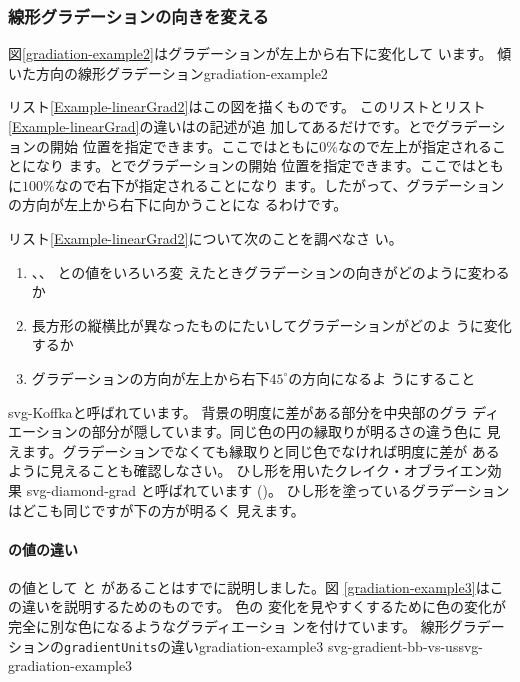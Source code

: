 \subsubsection{線形グラデーションの向きを変える}
図\ref{gradiation-example2}はグラデーションが左上から右下に変化して
います。
    {傾いた方向の線形グラデーション}{gradiation-example2}

リスト\ref{Example-linearGrad2}はこの図を描くものです。
このリストとリスト\ref{Example-linearGrad}の違いはの記述が追
加してあるだけです。とでグラデーションの開始
位置を指定できます。ここではともに$0\%$なので左上が指定されることになり
ます。とでグラデーションの開始
位置を指定できます。ここではともに$100\%$なので右下が指定されることになり
ます。したがって、グラデーションの方向が左上から右下に向かうことにな
るわけです。
\begin{Problem}\upshape
リスト\ref{Example-linearGrad2}について次のことを調べなさ い。
\begin{enumerate}
 \item  {}、、 との値をいろいろ変
 えたときグラデーションの向きがどのように変わるか
 \item 長方形の縦横比が異なったものにたいしてグラデーションがどのよ
       うに変化するか
 \item グラデーションの方向が左上から右下$45^{\circ}$の方向になるよ
       うにすること
\end{enumerate}
\end{Problem}
{svg-Koffka}{と呼ばれています。
背景の明度に差がある部分を中央部のグラ
ディエーションの部分が隠しています。同じ色の円の縁取りが明るさの違う色に
見えます。グラデーションでなくても縁取りと同じ色でなければ明度に差が
あるように見えることも確認しなさい。}
{ひし形を用いたクレイク・オブライエン効果}
{svg-diamond-grad}
{と呼ばれています
(\cite[58ページ図6.4]{Ninio})。
ひし形を塗っているグラデーションはどこも同じですが下の方が明るく
見えます。}
\paragraph{の値の違い}\label{diff-gradientUnits}
の値として と
があることはすでに説明しました。図
\ref{gradiation-example3}はこの違いを説明するためのものです。
%
色の
変化を見やすくするために色の変化が完全に別な色になるようなグラディエーショ
ンを付けています。
    {線形グラデーションの\protect\texttt{gradientUnits}の違い}{gradiation-example3}
{svg-gradient-bb-vs-us}{svg-gradiation-example3}{}

